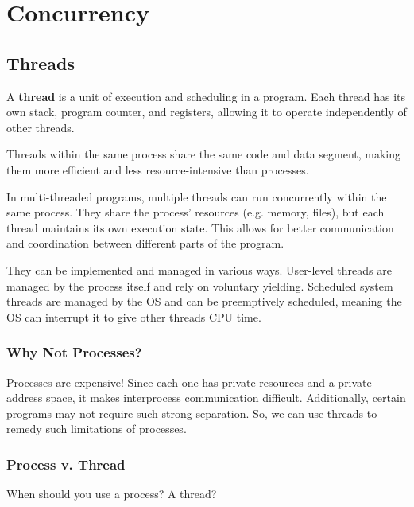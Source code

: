 \documentclass{report}
\newcommand{\definitionBegin}[1]{\begin{tcolorbox}[title={Definition: #1}]}
\newcommand{\definitionEnd}{\end{tcolorbox}}
\begin{document}
\part{Concurrency}
\chapter{Threads}
\definitionBegin{Thread}
A \textbf{thread} is a unit of execution and scheduling in a program. Each thread has its own stack,
program counter, and registers, allowing it to operate independently of other threads.
\definitionEnd

Threads within the same process share the same code and data segment, making them more efficient and
less resource-intensive than processes.

In multi-threaded programs, multiple threads can run concurrently within the same process. They
share the process' resources (e.g. memory, files), but each thread maintains its own execution
state. This allows for better communication and coordination between different parts of the
program.

They can be implemented and managed in various ways. User-level threads are managed by the process
itself and rely on voluntary yielding. Scheduled system threads are managed by the OS and can be
preemptively scheduled, meaning the OS can interrupt it to give other threads CPU time.


\section{Why Not Processes?}
Processes are expensive! Since each one has private resources and a private address space, it makes
interprocess communication difficult. Additionally, certain programs may not require such strong
separation. So, we can use threads to remedy such limitations of processes.

\section{Process v. Thread}
When should you use a process? A thread?
\end{document}
